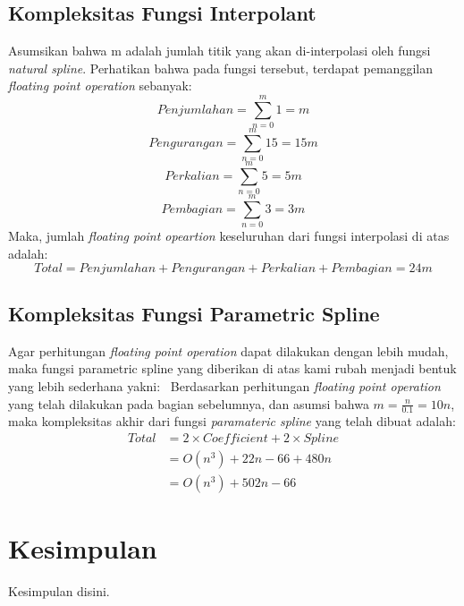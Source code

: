 \documentclass[journal,12pt,onecolumn,a4paper]{IEEEtran}
\begin{document}
\subsection{Kompleksitas Fungsi Interpolant}

Asumsikan bahwa m adalah jumlah titik yang akan di-interpolasi oleh fungsi \emph{natural spline}. Perhatikan bahwa pada fungsi tersebut, terdapat pemanggilan \emph{floating point operation} sebanyak:
\begin{equation}
	Penjumlahan = \sum_{n=0}^{m} 1 = m
\end{equation}
\begin{equation}
	Pengurangan = \sum_{n=0}^{m} 15 = 15m
\end{equation}
\begin{equation}
	Perkalian = \sum_{n=0}^{m} 5 = 5m
\end{equation}
\begin{equation}
	Pembagian = \sum_{n=0}^{m} 3 = 3m
\end{equation}
Maka, jumlah \emph{floating point opeartion} keseluruhan dari fungsi interpolasi di atas adalah:
\begin{equation}
	Total = Penjumlahan + Pengurangan + Perkalian + Pembagian = 24m
\end{equation}

\subsection{Kompleksitas Fungsi Parametric Spline}
Agar perhitungan \emph{floating point operation} dapat dilakukan dengan lebih mudah, maka fungsi parametric spline yang diberikan di atas kami rubah menjadi bentuk yang lebih sederhana yakni:
\
Berdasarkan perhitungan \emph{floating point operation} yang telah dilakukan pada bagian sebelumnya, dan asumsi bahwa \(m = \frac{n}{0.1} = 10n\), maka kompleksitas akhir dari fungsi \emph{paramateric spline} yang telah dibuat adalah:
\begin{equation}
	\begin{split}
		Total & = 2 \times Coefficient + 2 \times Spline\\
		& = O(n^3) + 22n - 66 + 480n\\
		& = O(n^3) + 502n - 66
	\end{split}
\end{equation}


\section{Kesimpulan}
Kesimpulan disini.
\end{document}
